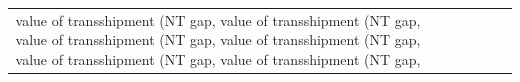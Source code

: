 \begin{table}[H]
\begin{tabular}{ccccccc}
value of transshipment (NT gap, %
value of transshipment (NT gap, %
value of transshipment (NT gap, %
value of transshipment (NT gap, %
value of transshipment (NT gap, %
value of transshipment (NT gap, %
\bottomrule
\end{tabular}
\end{table}